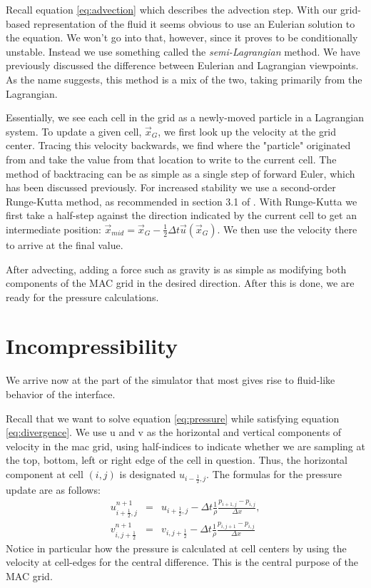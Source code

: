 Recall equation \vref{eq:advection} which describes the advection step. With our grid-based representation of the fluid it seems obvious to use an Eulerian solution to the equation. We won't go into that, however, since it proves to be conditionally unstable. Instead we use something called the \textit{semi-Lagrangian} method. We have previously discussed the difference between Eulerian and Lagrangian viewpoints. As the name suggests, this method is a mix of the two, taking primarily from the Lagrangian.

Essentially, we see each cell in the grid as a newly-moved particle in a Lagrangian system. To update a given cell, $\vec{x}_G$, we first look up the velocity at the grid center. Tracing this velocity backwards, we find where the "particle" originated from and take the value from that location to write to the current cell. The method of backtracing can be as simple as a single step of forward Euler, which has been discussed previously. For increased stability we use a second-order Runge-Kutta method, as recommended in section 3.1 of . With Runge-Kutta we first take a half-step against the direction indicated by the current cell to get an intermediate position: $\vec{x}_{mid} = \vec{x}_G - \frac{1}{2}\Delta t \vec{u}\left(\vec{x}_G\right)$. We then use the velocity there to arrive at the final value.

After advecting, adding a force such as gravity is as simple as modifying both components of the MAC grid in the desired direction. After this is done, we are ready for the pressure calculations.

\section{Incompressibility}
We arrive now at the part of the simulator that most gives rise to fluid-like behavior of the interface.

Recall that we want to solve equation \vref{eq:pressure} while satisfying equation \vref{eq:divergence}. We use u and v as the horizontal and vertical components of velocity in the mac grid, using half-indices to indicate whether we are sampling at the top, bottom, left or right edge of the cell in question. Thus, the horizontal component at cell $(i,j)$ is designated $u_{i-\frac{1}{2},j}$. The formulas for the pressure update are as follows:
\begin{eqnarray}
u_{i+\frac{1}{2},j}^{n+1} &=& u_{i+\frac{1}{2},j} - \Delta t\frac{1}{\rho}\frac{p_{i+1,j}-p_{i,j}}{\Delta x},\\
v_{i,j+\frac{1}{2}}^{n+1} &=& v_{i,j+\frac{1}{2}} - \Delta t\frac{1}{\rho}\frac{p_{i,j+1}-p_{i,j}}{\Delta x}
\end{eqnarray}
Notice in particular how the pressure is calculated at cell centers by using the velocity at cell-edges for the central difference. This is the central purpose of the MAC grid.

